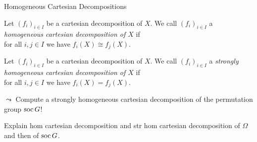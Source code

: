 \begin{frame}{Homogeneous Cartesian Decompositions}
    \begin{defn}
        Let $(f_i)_{i \in I}$ be a cartesian decomposition of $X$.
        We call $(f_i)_{i \in I}$ a
        \emph{homogeneous cartesian decomposition of $X$}
        if
        \\
        \pause
        for all $i,j \in I$ we have $f_i(X) \cong f_j(X)$.
    \end{defn}
    \pause

    \begin{defn}
        Let $(f_i)_{i \in I}$ be a cartesian decomposition of $X$.
        We call $(f_i)_{i \in I}$ a
        \emph{strongly homogeneous cartesian decomposition of $X$}
        if
        \\
        \pause
        for all $i,j \in I$ we have $f_i(X) = f_j(X)$.
    \end{defn}
    \pause

    $\leadsto$
    Compute a strongly homogeneous cartesian decomposition of the permutation
    group $\operatorname{soc} G$!
\end{frame}

\note
{
Explain hom cartesian decomposition and str hom cartesian decomposition of
$\Omega$ and then of $\operatorname{soc} G$.
}
